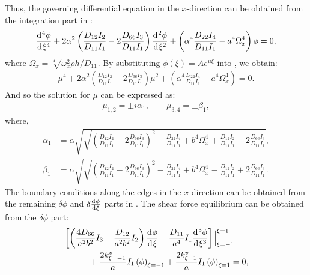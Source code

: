 \documentclass[preprint,12pt]{elsarticle}
\newcommand{\id}{\mathrm{d}\mkern1mu}
\begin{document}
%
Thus, the governing differential equation in the $ x $-direction can be obtained from the integration part in :
%
%
\begin{equation}\label{eq:ODEx}
		\frac{\id^4 \phi}{\id \xi^4}+ 2\alpha^2\left(\frac{D_{12}I_2}{D_{11}I_1}-2\frac{D_{66}I_3}{D_{11}I_1}\right)\frac{\id^2 \phi}{\id \xi^2}+\left(\alpha^4\frac{D_{22}I_4}{D_{11}I_1}-a^4\Omega_x^4\right)\phi=0,
\end{equation}
%
where $\Omega_x = \sqrt[4]{\omega_x^2 \rho h / D_{11}}$.
By substituting $\phi(\xi) = A e^{\mu \xi}$ into , we obtain:
%
\begin{equation}\label{eq:ODEx2}
	\begin{split}
		\mu^4 + 2\alpha^2\left(\frac{D_{12}I_2}{D_{11}I_1}-2\frac{D_{66}I_3}{D_{11}I_1}\right)\mu^2 + \left(\alpha^4\frac{D_{22}I_4}{D_{11}I_1}-a^4\Omega_x^4\right) = 0.
	\end{split}
\end{equation}
%
And so the solution for $\mu$ can be expressed as:
%
\begin{equation}\label{eq:mu}
	\begin{split}
		\mu_{1,2} = \pm\textit{i} \alpha_1, \qquad \mu_{3,4} = \pm \beta_1,
	\end{split}
\end{equation}
%
where,
%
\begin{subequations}\label{eq:alphax}
	\begin{align}
		\alpha_1 &= \alpha \sqrt{\sqrt{\left(\frac{D_{12}I_2}{D_{11}I_1}-2\frac{D_{66}I_3}{D_{11}I_1}\right)^2 - \frac{D_{22}I_4}{D_{11}I_1} + b^4\Omega_x^4} + \frac{D_{12}I_2}{D_{11}I_1} - 2\frac{D_{66}I_3}{D_{11}I_1}},\label{eq:alphax1}\\
		\beta_1 &= \alpha \sqrt{\sqrt{\left(\frac{D_{12}I_2}{D_{11}I_1}-2\frac{D_{66}I_3}{D_{11}I_1}\right)^2 - \frac{D_{22}I_4}{D_{11}I_1} + b^4\Omega_x^4} - \frac{D_{12}I_2}{D_{11}I_1} + 2\frac{D_{66}I_3}{D_{11}I_1}}.\label{eq:alphax2}
	\end{align}
\end{subequations}
%
The boundary conditions along the edges in the $x$-direction can be obtained from the remaining $\delta \phi$ and $\delta \frac{\id \phi}{\id \xi}$ parts in . 
The shear force equilibrium can be obtained from the $\delta \phi$ part:
%
\begin{equation}\label{eq:inertial_forcex}
	\begin{split}
		&\left[ \left( \frac{4D_{66}}{a^2b^2} I_3 - \frac{D_{12}}{a^2b^2} I_2 \right) \frac{\id \phi}{\id \xi} 
		- \frac{D_{11}}{a^4} I_1 \frac{\id^3 \phi}{\id \xi^3} \right] \Big|^{\xi=1}_{\xi=-1}\\
		&\quad\qquad+ \frac{2k^v_{\xi=-1}}{a} I_1 \left(\phi\right)_{\xi=-1}
		 + \frac{2k^v_{\xi=1}}{a} I_1 \left(\phi\right)_{\xi=1} = 0,
	\end{split}
\end{equation}
\end{document}
